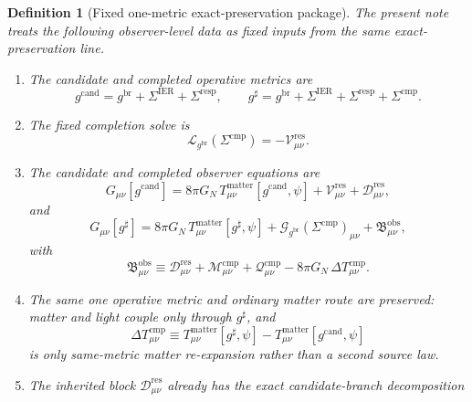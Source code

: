 \documentclass[11pt]{article}
\newcommand{\ObserverMetric}{g^{\mathrm{br}}}
\newcommand{\CandidateMetric}{g^{\mathrm{cand}}}
\newcommand{\CompletedMetric}{g^{\sharp}}
\newcommand{\BaseShift}{\Sigma^{\mathrm{IER}}}
\newcommand{\ResponseShift}{\Sigma^{\mathrm{resp}}}
\newcommand{\CompShift}{\Sigma^{\mathrm{cmp}}}
\newcommand{\ResidualCore}{\mathcal V_{\mu\nu}^{\mathrm{res}}}
\newcommand{\ResidualDec}{\mathcal D_{\mu\nu}^{\mathrm{res}}}
\newcommand{\ReducedEin}{\mathcal L_{\ObserverMetric}}
\newcommand{\GaugeBook}{\mathcal G_{\ObserverMetric}}
\newcommand{\CompMix}{\mathcal M_{\mu\nu}^{\mathrm{cmp}}}
\newcommand{\CompQuad}{\mathcal Q_{\mu\nu}^{\mathrm{cmp}}}
\newcommand{\DeltaTComp}{\Delta T_{\mu\nu}^{\mathrm{cmp}}}
\newcommand{\ObsBurden}{\mathfrak B_{\mu\nu}^{\mathrm{obs}}}
\newtheorem{definition}{Definition}
\begin{document}
\begin{definition}[Fixed one-metric exact-preservation package]
\label{def:fixed}
The present note treats the following observer-level data as fixed inputs from the same exact-preservation line.
\begin{enumerate}
    \item The candidate and completed operative metrics are
    \begin{equation}
    \CandidateMetric
    =
    \ObserverMetric+\BaseShift+\ResponseShift,
    \qquad
    \CompletedMetric
    =
    \ObserverMetric+\BaseShift+\ResponseShift+\CompShift.
    \label{eq:metrics}
    \end{equation}
    \item The fixed completion solve is
    \begin{equation}
    \ReducedEin(\CompShift)=-\ResidualCore.
    \label{eq:solve}
    \end{equation}
    \item The candidate and completed observer equations are
    \begin{equation}
    G_{\mu\nu}[\CandidateMetric]
    =
    8\pi G_N\,T_{\mu\nu}^{\mathrm{matter}}[\CandidateMetric,\psi]
    +\ResidualCore+\ResidualDec,
    \label{eq:candidate}
    \end{equation}
    and
    \begin{equation}
    G_{\mu\nu}[\CompletedMetric]
    =
    8\pi G_N\,T_{\mu\nu}^{\mathrm{matter}}[\CompletedMetric,\psi]
    +\GaugeBook(\CompShift)_{\mu\nu}
    +\ObsBurden,
    \label{eq:completed}
    \end{equation}
    with
    \begin{equation}
    \ObsBurden
    \equiv
    \ResidualDec+\CompMix+\CompQuad-8\pi G_N\,\DeltaTComp.
    \label{eq:burden}
    \end{equation}
    \item The same one operative metric and ordinary matter route are preserved: matter and light couple only through \(\CompletedMetric\), and
    \begin{equation}
    \DeltaTComp
    \equiv
    T_{\mu\nu}^{\mathrm{matter}}[\CompletedMetric,\psi]
    -
    T_{\mu\nu}^{\mathrm{matter}}[\CandidateMetric,\psi]
    \label{eq:deltatcomp}
    \end{equation}
    is only same-metric matter re-expansion rather than a second source law.
    \item The inherited block \(\ResidualDec\) already has the exact candidate-branch decomposition
    \begin{equation}

\end{equation}
\end{enumerate}
\end{definition}
\end{document}
